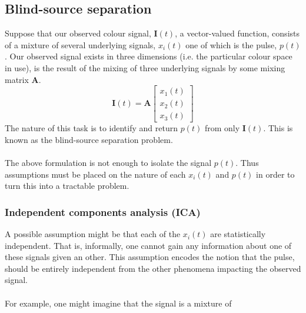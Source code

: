 \subsection{Blind-source separation}
Suppose that our observed colour signal, $\mathbf{I}(t)$, a vector-valued function, consists of a mixture of several underlying signals, $x_i(t)$ one of which is the pulse, $p(t)$. 
Our observed signal exists in three dimensions (i.e. the particular colour space in use), is the result of the mixing of three underlying signals by some mixing matrix $\mathbf{A}$.
\begin{equation*}
    \mathbf{I}(t) = \mathbf{A}\begin{bmatrix} x_1(t) \\ x_2(t) \\ x_3(t) \end{bmatrix}
\end{equation*}
The nature of this task is to identify and return $p(t)$ from only $\mathbf{I}(t)$. This is known as the blind-source separation problem. 
\\ \\
The above formulation is not enough to isolate the signal $p(t)$. Thus assumptions must be placed on the nature of each $x_i(t)$ and $p(t)$ in order to turn this into a tractable problem. 

\subsubsection{Independent components analysis (ICA)}
A possible assumption might be that each of the $x_i(t)$ are statistically independent. That is, informally, one cannot gain any information about one of these signals given an other. This assumption encodes the notion that the pulse, should be entirely independent from the other phenomena impacting the observed signal.
\\\\
For example, one might imagine that the signal is a mixture of 
%

